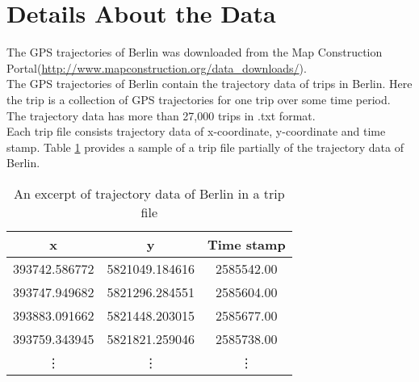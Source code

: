 \documentclass[11pt]{article}
\begin{document}
\section*{Details About the Data}
The GPS trajectories of Berlin was downloaded from the Map Construction Portal(\url{http://www.mapconstruction.org/data_downloads/}).  \\
The GPS trajectories of Berlin contain the trajectory data of trips in Berlin. Here the trip is a collection of GPS trajectories for one trip over some time period. The trajectory data has more than 27,000 trips in .txt format. \\
Each trip file consists trajectory data of x-coordinate, y-coordinate and time stamp. Table \ref{table:questions} provides a sample of a trip file partially of the trajectory data of Berlin.
\begin{table}
\begin{center}
\begin{tabular}{ |c |c| c| }
\hline
  x & y & Time stamp   \\ \hline
  393742.586772 & 5821049.184616 & 2585542.00   \\ \hline
  393747.949682 & 5821296.284551 & 2585604.00 \\  \hline
  393883.091662 & 5821448.203015 & 2585677.00  \\ \hline
  393759.343945 & 5821821.259046 & 2585738.00\\ \hline
  \vdots & \vdots & \vdots \\ \hline
\end{tabular}
\end{center}
\caption{An excerpt of trajectory data of Berlin in a trip file}
\label{table:questions}
\end{table}


\pagebreak
\end{document}
